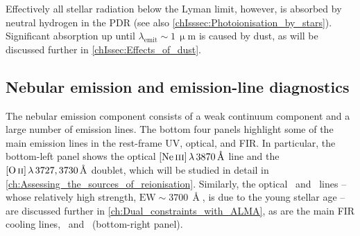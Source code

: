 Effectively all stellar radiation below the Lyman limit, however, is absorbed by neutral hydrogen in the PDR (see also \cref{chIsssec:Photoionisation_by_stars}). Significant absorption up until $\lambda_\text{emit} \sim 1 \, \mathrm{\upmu m}$ is caused by dust, as will be discussed further in \cref{chIssec:Effects_of_dust}.

\subsection{Nebular emission and emission-line diagnostics}
\label{chIssec:Nebular_emission_and_emission-line_diagnostics}

The nebular emission component consists of a weak continuum component and a large number of emission lines. The bottom four panels highlight some of the main emission lines in the rest-frame UV, optical, and FIR. In particular, the bottom-left panel shows the optical $\NeIII \, \lambda \, 3870 \, \Angstrom$ line and the $\OII \, \lambda \, 3727, 3730 \, \Angstrom$ doublet, which will be studied in detail in \cref{ch:Assessing_the_sources_of_reionisation}. Similarly, the optical \OIIIf\ and \Hbeta\ lines -- whose relatively high strength, $\text{EW} \sim 3700 \, \Angstrom$, is due to the young stellar age -- are discussed further in \cref{ch:Dual_constraints_with_ALMA}, as are the main FIR cooling lines, \CIILam\ and \OIIILam\ (bottom-right panel).

